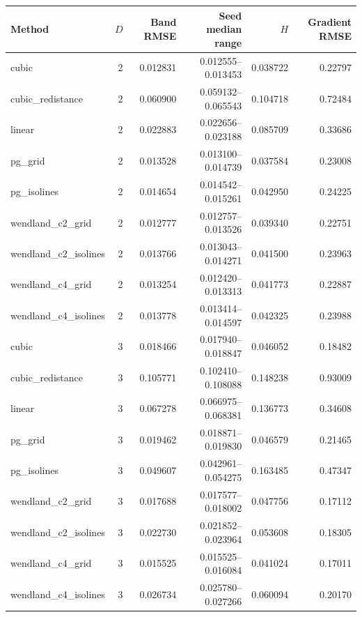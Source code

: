 \begin{tabular}{lrrrrr}\toprule
Method & $D$ & Band RMSE & Seed median range & $H$ & Gradient RMSE \\ \midrule
cubic & 2 & 0.012831 & 0.012555--0.013453 & 0.038722 & 0.22797 \\
cubic\_redistance & 2 & 0.060900 & 0.059132--0.065543 & 0.104718 & 0.72484 \\
linear & 2 & 0.022883 & 0.022656--0.023188 & 0.085709 & 0.33686 \\
pg\_grid & 2 & 0.013528 & 0.013100--0.014739 & 0.037584 & 0.23008 \\
pg\_isolines & 2 & 0.014654 & 0.014542--0.015261 & 0.042950 & 0.24225 \\
wendland\_c2\_grid & 2 & 0.012777 & 0.012757--0.013526 & 0.039340 & 0.22751 \\
wendland\_c2\_isolines & 2 & 0.013766 & 0.013043--0.014271 & 0.041500 & 0.23963 \\
wendland\_c4\_grid & 2 & 0.013254 & 0.012420--0.013313 & 0.041773 & 0.22887 \\
wendland\_c4\_isolines & 2 & 0.013778 & 0.013414--0.014597 & 0.042325 & 0.23988 \\
cubic & 3 & 0.018466 & 0.017940--0.018847 & 0.046052 & 0.18482 \\
cubic\_redistance & 3 & 0.105771 & 0.102410--0.108088 & 0.148238 & 0.93009 \\
linear & 3 & 0.067278 & 0.066975--0.068381 & 0.136773 & 0.34608 \\
pg\_grid & 3 & 0.019462 & 0.018871--0.019830 & 0.046579 & 0.21465 \\
pg\_isolines & 3 & 0.049607 & 0.042961--0.054275 & 0.163485 & 0.47347 \\
wendland\_c2\_grid & 3 & 0.017688 & 0.017577--0.018002 & 0.047756 & 0.17112 \\
wendland\_c2\_isolines & 3 & 0.022730 & 0.021852--0.023964 & 0.053608 & 0.18305 \\
wendland\_c4\_grid & 3 & 0.015525 & 0.015525--0.016084 & 0.041024 & 0.17011 \\
wendland\_c4\_isolines & 3 & 0.026734 & 0.025780--0.027266 & 0.060094 & 0.20170 \\
\bottomrule\end{tabular}
